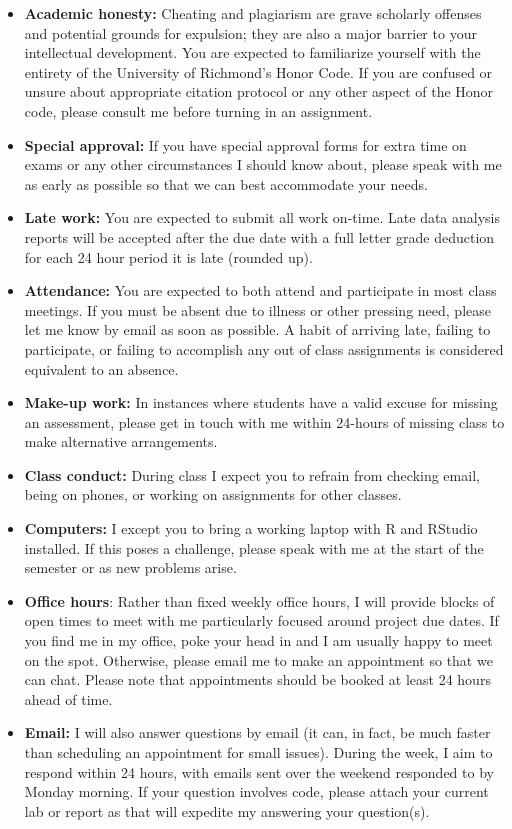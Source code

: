 \documentclass[12pt]{article}
\begin{document}
\begin{itemize}\setlength\itemsep{0em}
\item \textbf{Academic honesty:} Cheating and plagiarism are grave scholarly
offenses and potential grounds
for expulsion; they are also a major barrier to your intellectual development.
You are expected to familiarize yourself with the entirety of the
University of Richmond’s Honor Code. If you are confused or unsure about
appropriate citation protocol or any other aspect of the Honor code,
please consult me before turning in an assignment.
\item \textbf{Special approval:} If you have special approval forms for extra
time on exams or any other circumstances I should know about, please speak
with me as early as possible so that we can best accommodate your needs.
\item \textbf{Late work:} You are expected to submit all work on-time. Late 
data analysis reports will be accepted after the due date with a full letter
grade deduction for each 24 hour period it is late (rounded up).
\item \textbf{Attendance:} You are expected to both attend and participate in most
class meetings. If you must be absent due to illness or other pressing
need, please let me know by email as soon as possible. A habit of arriving
late, failing to participate, or failing to accomplish any out of class assignments
is considered equivalent to an absence.
\item \textbf{Make-up work:} In instances where students have a valid excuse for
missing an assessment, please get in touch with me within 24-hours of missing
class to make alternative arrangements.
\item \textbf{Class conduct:} During class I expect you to refrain from checking
email, being on phones, or working on assignments for other classes.
\item \textbf{Computers:} I except you to bring a working laptop with R and 
RStudio installed. If this poses a challenge, please speak with me at the 
start of the semester or as new problems arise.
\item \textbf{Office hours}: Rather than fixed weekly office hours, I will 
provide blocks of open times to meet with me particularly focused around
project due dates. If you find me in my office, poke your head in and I
am usually happy to meet on the spot. Otherwise, please email me to make an
appointment so that we can chat. Please note that appointments should
be booked at least 24 hours ahead of time.
\item \textbf{Email:} I will also answer questions by email (it can, in fact,
be much faster than scheduling an appointment for small issues). During the
week, I aim to respond within 24 hours, with emails sent over the weekend
responded to by Monday morning. If your question involves code, please attach
your current lab or report as that will expedite my answering your question(s).
\end{itemize}
\end{document}
